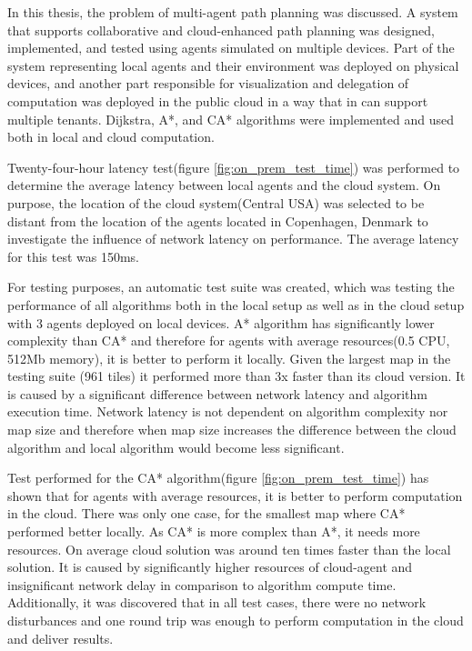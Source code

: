 In this thesis, the problem of multi-agent path planning was discussed. A system that supports collaborative and cloud-enhanced path planning was designed, implemented, and tested using agents simulated on multiple devices. Part of the system representing local agents and their environment was deployed on physical devices, and another part responsible for visualization and delegation of computation was deployed in the public cloud in a way that in can support multiple tenants. Dijkstra, A*, and CA* algorithms were implemented and used both in local and cloud computation.

Twenty-four-hour latency test(figure \ref{fig:on_prem_test_time}) was performed to determine the average latency between local agents and the cloud system. On purpose, the location of the cloud system(Central USA) was selected to be distant from the location of the agents located in Copenhagen, Denmark to investigate the influence of network latency on performance. The average latency for this test was 150ms.

For testing purposes, an automatic test suite was created, which was testing the performance of all algorithms both in the local setup as well as in the cloud setup with 3 agents deployed on local devices. A* algorithm has significantly lower complexity  than CA* and therefore for agents with average resources(0.5 CPU, 512Mb memory), it is better to perform it locally. Given the largest map in the testing suite (961 tiles) it performed more than 3x faster than its cloud version. It is caused by a significant difference between network latency and algorithm execution time. Network latency is not dependent on algorithm complexity nor map size and therefore when map size increases the difference between the cloud algorithm and local algorithm would become less significant.

Test performed for the CA* algorithm(figure \ref{fig:on_prem_test_time}) has shown that for agents with average resources, it is better to perform computation in the cloud. There was only one case, for the smallest map where CA* performed better locally. As CA* is more complex than A*, it needs more resources. On average cloud solution was around ten times faster than the local solution. It is caused by significantly higher resources of cloud-agent and insignificant network delay in comparison to algorithm compute time. Additionally, it was discovered that in all test cases, there were no network disturbances and one round trip was enough to perform computation in the cloud and deliver results.

